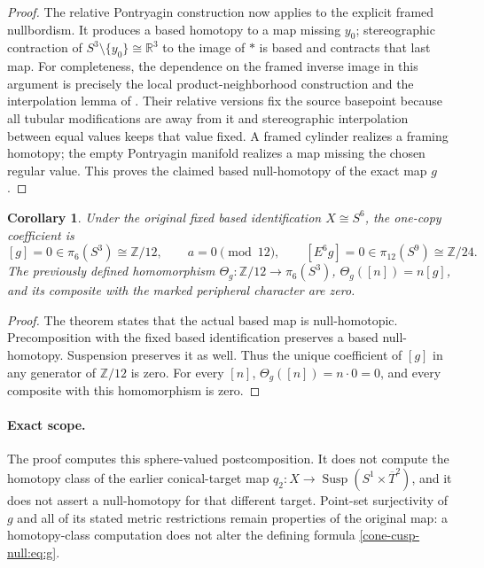 \documentclass[11pt,letterpaper]{article}
\numberwithin{equation}{section}
\newtheorem{corollary}[theorem]{Corollary}
\theoremstyle{definition}
\theoremstyle{remark}
\begin{document}
\begin{proof}
The relative Pontryagin construction now applies to the explicit
framed nullbordism. It produces a based homotopy to a map missing
\(y_0\); stereographic contraction of \(S^3\setminus\{y_0\}\cong\mathbb R^3\)
to the image of \(*\) is based and contracts that last map.
For completeness, the dependence on the framed inverse image in this
argument is precisely the local product-neighborhood construction and
the interpolation lemma of \cite[\S7, Theorem B and Lemma 4,
pp.~43, 48--50]{Milnor1965Cusp}. Their relative versions fix the source
basepoint because all tubular modifications are away from it and
stereographic interpolation between equal values keeps that value
fixed. A framed cylinder realizes a framing homotopy; the empty
Pontryagin manifold realizes a map missing the chosen regular value.
This proves the claimed based null-homotopy of the exact map \(g\).
\end{proof}

\begin{corollary}
Under the original fixed based identification \(X\cong S^6\), the
one-copy coefficient is
\[
 [g]=0\in\pi_6(S^3)\cong\mathbb Z/12,\qquad a=0\pmod{12},\qquad
 [E^6g]=0\in\pi_{12}(S^9)\cong\mathbb Z/24.
\]
The previously defined homomorphism
\(\Theta_g:\mathbb Z/12\to\pi_6(S^3)\), \(\Theta_g([n])=n[g]\), and
its composite with the marked peripheral character are zero.
\end{corollary}
\begin{proof}
The theorem states that the actual based map is null-homotopic.
Precomposition with the fixed based identification preserves a based
null-homotopy. Suspension preserves it as well. Thus the unique
coefficient of \([g]\) in any generator of \(\mathbb Z/12\) is zero.
For every \([n]\), \(\Theta_g([n])=n\cdot0=0\), and every
composite with this homomorphism is zero.
\end{proof}

\paragraph{Exact scope.}
The proof computes this sphere-valued postcomposition. It does not
compute the homotopy class of the earlier conical-target map
\(q_2:X\to\operatorname{Susp}(S^1\times\overline T^2)\), and it
does not assert a null-homotopy for that different target. Point-set
surjectivity of \(g\) and all of its stated metric restrictions remain
properties of the original map: a homotopy-class computation does not
alter the defining formula \eqref{cone-cusp-null:eq:g}.
\end{document}

